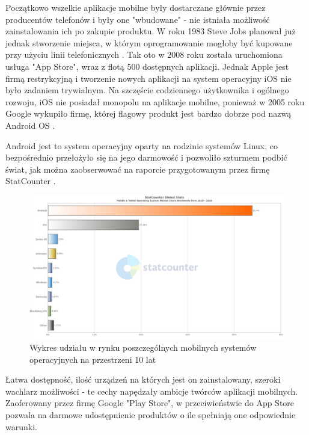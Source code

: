 \documentclass[12pt, a4paper]{article}
\begin{document}
\begin{sloppypar}
{{    Początkowo wszelkie aplikacje mobilne były dostarczane głównie przez producentów
    telefonów i były one "wbudowane" - nie istniała możliwość zainstalowania
    ich po zakupie produktu. W roku 1983 Steve Jobs planował już jednak stworzenie
    miejsca, w którym oprogramowanie mogłoby być kupowane przy użyciu linii
    telefonicznych \cite{history4}. Tak oto w 2008 roku została uruchomiona usługa
    "App Store", wraz z flotą 500 dostępnych aplikacji. Jednak Apple jest firmą
    restrykcyjną i tworzenie nowych aplikacji na system operacyjny iOS nie było 
    zadaniem trywialnym. Na szczęście codziennego użytkownika i ogólnego rozwoju, 
    iOS nie posiadał monopolu na aplikacje mobilne, ponieważ w 2005 roku Google
    wykupiło firmę, której flagowy produkt jest bardzo dobrze pod nazwą Android OS
    \cite{history3}.

    Android jest to system operacyjny oparty na rodzinie systemów Linux, co bezpośrednio
    przełożyło się na jego darmowość i pozwoliło szturmem podbić świat, jak można
    zaobserwować na raporcie przygotowanym przez firmę StatCounter \cite{os}.
    \begin{figure}[H]
      \centering
      \includegraphics[width=.9\textwidth]{android_chart.png}
      \caption{Wykres udziału w rynku poszczególnych mobilnych systemów operacyjnych na przestrzeni 10 lat}
      \label{fig:android}
    \end{figure}
    Łatwa dostępność, ilość urządzeń na których jest on zainstalowany, szeroki wachlarz
    możliwości - te cechy napędzały ambicje twórców aplikacji mobilnych. Zaoferowany
    przez firmę Google "Play Store", w przeciwieństwie do App Store pozwala na darmowe
    udostępnienie produktów o ile spełniają one odpowiednie warunki.

}}
\end{sloppypar}
\end{document}
